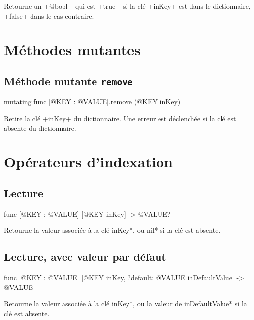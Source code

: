 Retourne un \ggsq+@bool+ qui est \ggsq+true+ si la clé \ggsq+inKey+ est dans le dictionnaire, \ggsq+false+ dans le cas contraire.









\section{Méthodes mutantes}



\subsection{Méthode mutante \texttt{remove}}

\begin{galgas4}
mutating func [@KEY : @VALUE].remove (@KEY inKey)
\end{galgas4}

Retire la clé \ggsq+inKey+ du dictionnaire. Une erreur est déclenchée si la clé est absente du dictionnaire.





\section{Opérateurs d'indexation}

\subsection{Lecture}

\begin{galgas4box}
func [@KEY : @VALUE] [@KEY inKey] -> @VALUE?
\end{galgas4box}

Retourne la valeur associée à la clé \ggsq*inKey*, ou \ggsq*nil* si la clé est absente.


\subsection{Lecture, avec valeur par défaut}

\begin{galgas4box}
func [@KEY : @VALUE] [@KEY inKey, ?default: @VALUE inDefaultValue] -> @VALUE
\end{galgas4box}

Retourne la valeur associée à la clé \ggsq*inKey*, ou la valeur de \ggsq*inDefaultValue* si la clé est absente.



